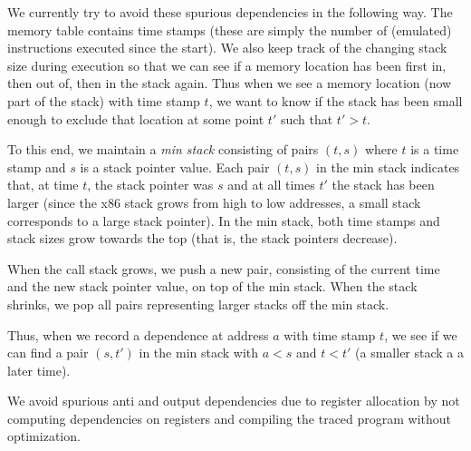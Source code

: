 We currently try to avoid these spurious dependencies in the following
way. The memory table contains time stamps (these are simply the
number of (emulated) instructions executed since the start). We also
keep track of the changing stack size during execution so that we can
see if a memory location has been first in, then out of, then in the
stack again. Thus when we see a memory location (now part of the
stack) with time stamp $t$, we want to know if the stack has been
small enough to exclude that location at some point $t'$ such that 
$t'>t$. 

To this end, we maintain a {\em min stack} consisting of pairs $(t,s)$
where $t$ is a time stamp and $s$ is a stack pointer value. Each pair
$(t,s)$ in the min stack indicates that, at time $t$, the stack
pointer was $s$ and at all times $t'$ the stack has been larger (since
the x86 stack grows from high to low addresses, a small stack
corresponds to a large stack pointer). In the min stack, both
time stamps and stack sizes grow towards the top (that is, the stack
pointers decrease).

When the
call stack grows, we push a new pair, consisting of the current time
and the new stack pointer value, on top of the min stack. When the
stack shrinks, we pop all pairs representing larger stacks off the min
stack.

Thus, when we record a dependence at address $a$ with time stamp $t$,
we see if we can find a pair $(s,t')$ in the min stack with $a<s$ and
$t<t'$ (a smaller stack a a later time).

We avoid spurious anti and output dependencies due to register
allocation by not computing dependencies on registers and compiling
the traced program without optimization. 
